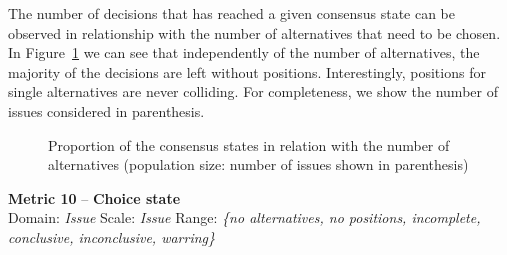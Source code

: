 \documentclass[article]{elsarticle}
\begin{document}
The number of decisions that has reached a given consensus state can be observed in relationship with the number of alternatives that need to be chosen.
In Figure~\ref{fig:M9} we can see that independently of the number of alternatives, the majority of the decisions are left without positions. Interestingly, positions for single alternatives are never colliding. For completeness, we show the number of issues considered in parenthesis.
\begin{figure}
  \begin{center}

  \caption{Proportion of the consensus states in relation with the number of alternatives (population size: number of issues shown in parenthesis)}
  \label{fig:M9}
  \end{center}
\end{figure}

\clearpage
\noindent
\textbf{Metric 10} -- \textbf{Choice state}\\
Domain: \emph{Issue} Scale: \emph{Issue} Range: \emph{\{no alternatives, no positions, incomplete, conclusive, inconclusive, warring\}}
\end{document}
